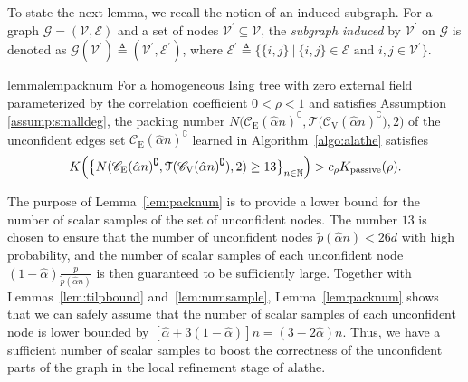 \documentclass[11pt,onecolumn]{article}
\newcommand{\calE}{\mathcal{E}}
\newcommand{\calG}{\mathcal{G}}
\newcommand{\calT}{\mathcal{T}}
\newcommand{\calV}{\mathcal{V}}
\newcommand{\bbN}{\mathbb{N}}
\newcommand{\scC}{\mathscr{C}}
\newcommand{\tilp}{\tilde{p}}
\newcommand{\halpha}{\hat{\alpha}}
\newcommand{\Passive}{{\rm passive}}
\begin{document}
To state the next lemma, we recall the notion of an induced subgraph. For a graph $\calG=(\calV,\calE)$ and a set of nodes $\calV^{\prime}\subseteq \calV$, the  {\em subgraph induced} by $\calV^{\prime}$ on $\calG$ is   denoted as $\calG(\calV^{\prime}) \triangleq (\calV^{\prime},\calE^{\prime})$, where 
$\calE^{\prime}\triangleq\{\{i,j\}\ | \ \{i,j\}\in \calE \text{ and }i,j\in\calV^{\prime}\}$. 

\begin{restatable}{lemma}{lempacknum}
\label{lem:packnum}
For a homogeneous Ising tree with zero external field  parameterized by the correlation coefficient $0<\rho<1$ and satisfies Assumption \ref{assump:smalldeg}, the packing number $N\big(\scC_{\mathrm{E}}(\halpha n)^{\complement},\calT\big(\scC_{\mathrm{V}}(\halpha n)^{\complement}\big),2\big)$ of the unconfident edges set $\scC_{\mathrm{E}}(\halpha n)^{\complement}$ 
learned in Algorithm~\ref{algo:alathe} satisfies
\begin{align}
	K\Big(\big\{N(\scC_{\mathrm{E}}(\halpha n)^{\complement},\calT(\scC_{\mathrm{V}}(\halpha n)^{\complement}),2)\geq 13\big\}_{n\in\bbN}\Big)>c_{\rho}K _{\Passive}(\rho).
\end{align}
\end{restatable}
The purpose of Lemma~\ref{lem:packnum} is to provide a lower bound for the number of scalar samples of the set of unconfident nodes. The number $13$ is chosen to ensure that the number of unconfident nodes $\tilp(\halpha n)<26d$ with high probability, and the number of scalar samples of each unconfident node $(1-\halpha)\frac{p}{\tilp(\halpha n)}$ is then guaranteed to be sufficiently large. Together with Lemmas~\ref{lem:tilpbound} and~\ref{lem:numsample}, Lemma~\ref{lem:packnum} shows that we can safely assume   that the number of scalar samples of each unconfident node is lower bounded by $[\halpha+3(1-\halpha)]n=(3-2\halpha)n$. Thus, we have a sufficient number of scalar samples to boost the correctness of the unconfident parts of the graph in the local refinement stage of \ac{alathe}. 
\end{document}
